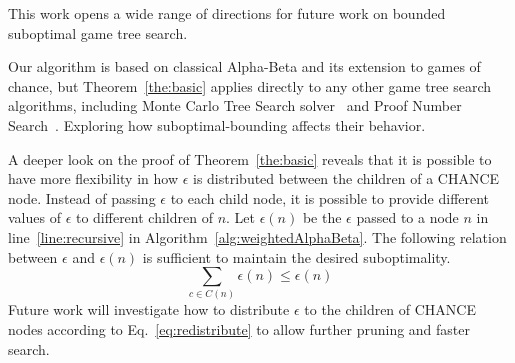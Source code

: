 \documentclass[runningheads]{llncs}
\newcommand{\MM}{\mathit{V}}
\newcommand{\pess}{\mathit{L}}
\newcommand{\opti}{\mathit{U}}
\newcommand{\rootnode}{\mathit{n_1}}
\begin{document}
This work opens a wide range of directions for future work on bounded suboptimal game tree search. 

 Our algorithm is based on classical Alpha-Beta and its extension to games of chance, but Theorem~\ref{the:basic} applies directly to any other game tree search algorithms, including Monte Carlo Tree Search solver~\citep{lanctot2013monte} and Proof Number Search~\citep{allis1994proof}. Exploring how suboptimal-bounding affects their behavior. 


A deeper look on the proof of Theorem~\ref{the:basic} reveals that it is possible to have more flexibility in how $\epsilon$ is distributed between the children of a CHANCE node. Instead of passing $\epsilon$ to each child node, it is possible to provide different values of $\epsilon$ to different children of $n$. 
Let $\epsilon(n)$ be the $\epsilon$ passed to a node $n$ in line~\ref{line:recursive} in Algorithm~\ref{alg:weightedAlphaBeta}. The following relation between $\epsilon$ and $\epsilon(n)$ is sufficient to maintain the desired suboptimality. 
\begin{equation}
	\sum_{c\in C(n)}
			\epsilon(n) \leq \epsilon(n) 
          \label{eq:redistribute}
\end{equation}          
Future work will investigate how to distribute  $\epsilon$ to the children of CHANCE nodes according to Eq.~\ref{eq:redistribute} to allow further pruning and faster search. 
\end{document}
